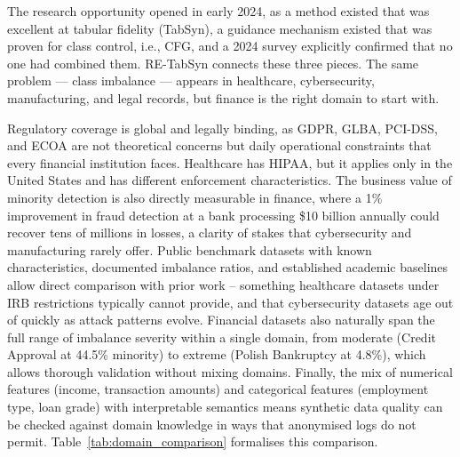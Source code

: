 The research opportunity opened in early 2024, as a method existed that was excellent at tabular fidelity (TabSyn), a guidance mechanism existed that was proven for class control, i.e., CFG, and a 2024 survey \cite{nidhi2024rare} explicitly confirmed that no one had combined them. RE-TabSyn connects these three pieces. The same problem — class imbalance — appears in healthcare, cybersecurity, manufacturing, and legal records, but finance is the right domain to start with.

Regulatory coverage is global and legally binding, as GDPR, GLBA, PCI-DSS, and ECOA are not theoretical concerns but daily operational constraints that every financial institution faces. Healthcare has HIPAA, but it applies only in the United States and has different enforcement characteristics. The business value of minority detection is also directly measurable in finance, where a 1\% improvement in fraud detection at a bank processing \$10 billion annually could recover tens of millions in losses, a clarity of stakes that cybersecurity and manufacturing rarely offer. Public benchmark datasets with known characteristics, documented imbalance ratios, and established academic baselines allow direct comparison with prior work -- something healthcare datasets under IRB restrictions typically cannot provide, and that cybersecurity datasets age out of quickly as attack patterns evolve. Financial datasets also naturally span the full range of imbalance severity within a single domain, from moderate (Credit Approval at 44.5\% minority) to extreme (Polish Bankruptcy at 4.8\%), which allows thorough validation without mixing domains. Finally, the mix of numerical features (income, transaction amounts) and categorical features (employment type, loan grade) with interpretable semantics means synthetic data quality can be checked against domain knowledge in ways that anonymised logs do not permit. Table~\ref{tab:domain_comparison} formalises this comparison.

\renewcommand{\arraystretch}{1.2}


